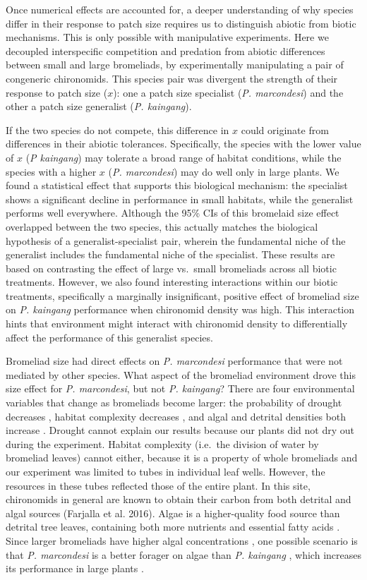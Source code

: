 Once numerical effects are accounted for, a deeper understanding of why
species differ in their response to patch size requires us to
distinguish abiotic from biotic mechanisms. This is only possible with
manipulative experiments. Here we decoupled interspecific competition
and predation from abiotic differences between small and large
bromeliads, by experimentally manipulating a pair of congeneric
chironomids. This species pair was divergent the strength of their
response to patch size (\(x\)): one a patch size specialist (\emph{P.
marcondesi}) and the other a patch size generalist (\emph{P. kaingang}).

If the two species do not compete, this difference in $x$ could originate from differences in their abiotic
tolerances. Specifically, the species with the lower value of $x$ (\emph{P kaingang}) may tolerate a broad
range of habitat conditions, while the species with a higher $x$ (\emph{P. marcondesi}) may do well only in large plants. We
found a statistical effect that supports this biological mechanism: the
specialist shows a significant decline in performance in small habitats,
while the generalist performs well everywhere. Although the 95\% CIs of
this bromelaid size effect overlapped between the two species, this
actually matches the biological hypothesis of a generalist-specialist
pair, wherein the fundamental niche of the generalist includes the
fundamental niche of the specialist. These results are based on
contrasting the effect of large vs.~small bromeliads across all biotic
treatments. However, we also found interesting interactions within our
biotic treatments, specifically a marginally insignificant, positive
effect of bromeliad size on \emph{P. kaingang} performance when
chironomid density was high. This interaction hints that environment
might interact with chironomid density to differentially affect the
performance of this generalist species.

Bromeliad size had direct effects on \emph{P. marcondesi} performance
that were not mediated by other species. What aspect of the bromeliad
environment drove this size effect for \emph{P. marcondesi}, but not
\emph{P. kaingang}? There are four environmental variables that change
as bromeliads become larger: the probability of drought decreases
\citep{Amundrud2015}, habitat complexity decreases
\citep{Srivastava2006a}, and algal and detrital densities both increase
\citep{Richardson1999, Marino2011}. Drought cannot explain our results
because our plants did not dry out during the experiment. Habitat
complexity (i.e.~the division of water by bromeliad leaves) cannot
either, because it is a property of whole bromeliads and our experiment
was limited to tubes in individual leaf wells. However, the resources in
these tubes reflected those of the entire plant. In this site,
chironomids in general are known to obtain their carbon from both
detrital and algal sources (Farjalla et al. 2016). Algae is a
higher-quality food source than detrital tree leaves, containing both
more nutrients and essential fatty acids \citep{Torres-Ruiz2007}. Since
larger bromeliads have higher algal concentrations \citep{Marino2011},
one possible scenario is that \emph{P. marcondesi} is a better forager
on algae than \emph{P. kaingang} , which increases its performance in
large plants .

